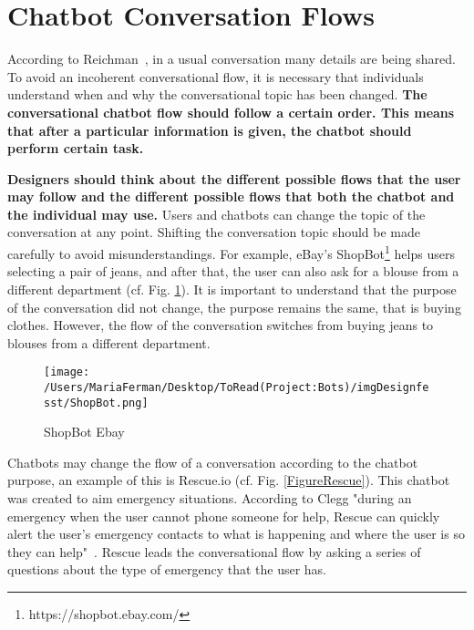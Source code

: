 \documentclass[a4paper,10pt]{article}
\begin{document}
\section{Chatbot Conversation Flows}
According to Reichman~\cite{reichman1985getting}, in a usual conversation many details are being shared. To avoid an incoherent conversational flow, it is necessary that individuals understand when and why the conversational topic has been changed. \textbf{The conversational chatbot flow should follow a certain order. This means that after a particular information is given, the chatbot should perform certain task.} 

\textbf{Designers should think about the different possible flows that the user may follow and the different possible flows that both the chatbot and the individual may use.} Users and chatbots can change the topic of the conversation at any point. Shifting the conversation topic should be made carefully to avoid misunderstandings. For example, eBay's ShopBot\footnote{https://shopbot.ebay.com/} helps users selecting a pair of jeans, and after that, the user can also ask for a blouse from a different department (cf. Fig. \ref{FigureEbay}). It is important to understand that the purpose of the conversation did not change, the purpose remains the same, that is buying clothes. However, the flow of the conversation switches from buying jeans to blouses from a different department.
\begin{figure}
\centering
\texttt{[image: /Users/MariaFerman/Desktop/ToRead(Project:Bots)/imgDesignfesst/ShopBot.png]}
\caption{ShopBot Ebay}
\label{FigureEbay}
\end{figure}
Chatbots may change the flow of a conversation according to the chatbot purpose, an example of this is Rescue.io (cf. Fig. \ref{FigureRescue}). This chatbot was created to aim emergency situations. According to Clegg "during an emergency when the user cannot phone someone for help, Rescue can quickly alert the user's emergency contacts to what is happening and where the user is so they can help"~\cite{Rescue}. Rescue leads the conversational flow by asking a series of questions about the type of emergency that the user has. 
\end{document}
